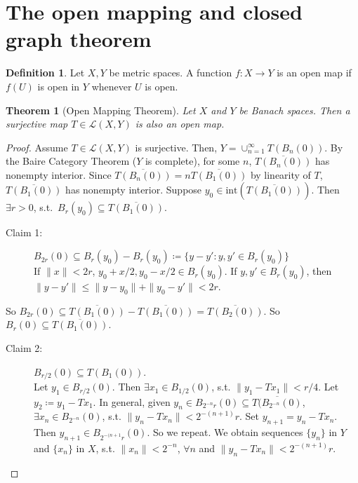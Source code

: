 \documentclass[12pt]{article}
\theoremstyle{plain}
\newtheorem{thm}{Theorem}
\theoremstyle{definition}
\newtheorem*{defn}{Definition}
\begin{document}
\section*{The open mapping and closed graph theorem}
\begin{defn}
    Let $X, Y$ be metric spaces.
    A function $f: X\rightarrow Y$ is an open map if $f(U)$ is open in $Y$ whenever $U$ is open.
\end{defn}

\begin{thm}[Open Mapping Theorem]
    Let $X$ and $Y$ be Banach spaces.
    Then a surjective map $T\in \mathcal{L}(X,Y)$ is also an open map.
\end{thm}
\begin{proof}
    Assume $T\in \mathcal{L}(X,Y)$ is surjective.
    Then, $Y=\cup_{n=1}^\infty T(B_n(0))$.
    By the Baire Category Theorem ($Y$ is complete), for some $n$, $\overline{T(B_n(0))}$ has nonempty interior.
    Since $\overline{T(B_n(0))} = n\overline{T(B_1(0))}$ by linearity of $T$, $\overline{T(B_1(0))}$ has nonempty interior.
    Suppose $y_0 \in \text{int}(\overline{T(B_1(0))})$.
    Then $\exists r>0$, s.t.\ $B_r(y_0) \subseteq \overline{T(B_1(0))}$.
    \begin{description}
        \item[Claim 1: ]$B_{2r}(0)\subseteq B_r(y_0) - B_r(y_0)\coloneqq \{y-y':y, y'\in B_r(y_0)\}$\\
            If $\|x\| < 2r$, $y_0+x/2, y_0-x/2\in B_r(y_0)$.
            If $y, y'\in B_r(y_0)$, then $\|y-y'\| \leq \|y-y_0\| + \|y_0-y'\| < 2r$.
    \end{description}
    So $B_{2r}(0)\subseteq \overline{T(B_1(0))} - \overline{T(B_1(0))} = \overline{T(B_2(0))}$.
    So $B_r(0)\subseteq \overline{T(B_1(0))}$.
    \begin{description}
        \item[Claim 2: ]$B_{r/2}(0) \subseteq T(B_1(0))$.\\
            Let $y_1\in B_{r/2}(0)$.
            Then $\exists x_1\in B_{1/2}(0)$, s.t. $\|y_1 - Tx_1\|<r/4$.
            Let $y_2\coloneqq y_1-Tx_1$.
            In general, given $y_n \in B_{2^{-n}r}(0) \subseteq \overline{T(B_{2^{-n}}(0)}$,
            $\exists x_n\in B_{2^{-n}}(0)$, s.t. $\|y_n - Tx_n\| < 2^{-(n+1)}r$.
            Set $y_{n+1} = y_n - Tx_n$.
            Then $y_{n+1}\in B_{2^{-(n+1}r}(0)$.
            So we repeat.
            We obtain sequences $\{y_n\}$ in $Y$ and $\{x_n\}$ in $X$, s.t. $\|x_n\| < 2^{-n}$, $\forall n$ and $\|y_n -
            Tx_n\|<2^{-(n+1)}r$.

\end{description}
\end{proof}
\end{document}
